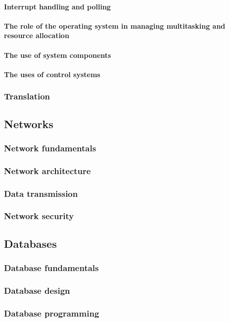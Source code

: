 \documentclass[a4paper,12pt]{article}
\begin{document}
\paragraph{Interrupt handling and polling}
\paragraph{The role of the operating system in managing multitasking and resource allocation}
\paragraph{The use of system components}
\paragraph{The uses of control systems}
\subsubsection{Translation}
\subsection{Networks}
\subsubsection{Network fundamentals}
\subsubsection{Network architecture}
\subsubsection{Data transmission}
\subsubsection{Network security}
\subsection{Databases}
\subsubsection{Database fundamentals}
\subsubsection{Database design}
\subsubsection{Database programming}
\end{document}

